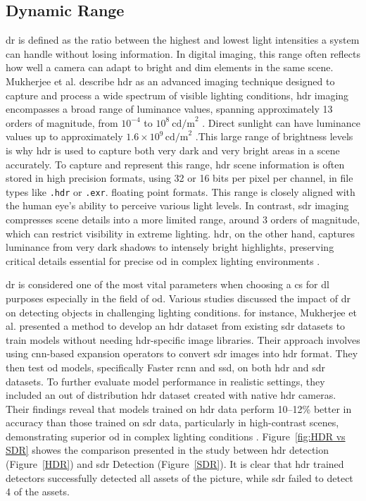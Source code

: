 \subsection{Dynamic Range}
\gls{dr}  is defined as the ratio between the highest and lowest light intensities a system can handle without losing information. In digital imaging, this range often reflects how well a camera can adapt to bright and dim elements in the same scene. Mukherjee et al. describe \gls{hdr} as an advanced imaging technique designed to capture and process a wide spectrum of visible lighting conditions, \gls{hdr} imaging encompasses a broad range of luminance values, spanning approximately 13 orders of magnitude, from \( 10^{-4} \) to \( 10^8 \ \text{cd/m}^2 \) \cite{HDR}. Direct sunlight can have luminance values up to approximately \( 1.6 \times 10^9 \, \text{cd/m}^2 \) \cite{sunlight_lum}.This large range of brightness levels is why \gls{hdr} is used to capture both very dark and very bright areas in a scene accurately. To capture and represent this range, \gls{hdr} scene information is often stored in high precision formats, using 32 or 16 bits per pixel per channel, in file types like \texttt{.hdr} or \texttt{.exr}. floating point formats. This range is closely aligned with the human eye’s ability to perceive various light levels. In contrast, \gls{sdr} imaging compresses scene details into a more limited range, around 3 orders of magnitude, which can restrict visibility in extreme lighting. \gls{hdr}, on the other hand, captures luminance from very dark shadows to intensely bright highlights, preserving critical details essential for precise \gls{od} in complex lighting environments \cite{HDR}.

\gls{dr} is considered one of the most vital parameters when choosing a \gls{cs} for \gls{dl} purposes especially in the field of \gls{od}. Various studies discussed the impact of \gls{dr} on detecting objects in challenging lighting conditions. for instance, Mukherjee et al. presented a method to develop an \gls{hdr} dataset from existing \gls{sdr} datasets to train models without needing \gls{hdr}-specific image libraries. Their approach involves using \gls{cnn}-based expansion operators to convert \gls{sdr} images into \gls{hdr} format. They then test \gls{od} models, specifically Faster \gls{rcnn} and \gls{ssd}, on both \gls{hdr} and \gls{sdr} datasets. To further evaluate model performance in realistic settings, they included an out of distribution \gls{hdr} dataset created with native \gls{hdr} cameras. Their findings reveal that models trained on \gls{hdr} data perform 10–12\% better in accuracy than those trained on \gls{sdr} data, particularly in high-contrast scenes, demonstrating superior \gls{od} in complex lighting conditions \cite{HDR}. Figure~\ref{fig:HDR vs SDR} showes the comparison presented in the study between \gls{hdr} detection (Figure~\ref{HDR}) and \gls{sdr} Detection (Figure~\ref{SDR}). It is clear that \gls{hdr} trained detectors successfully detected all assets of the picture, while \gls{sdr} failed to detect 4 of the assets.

